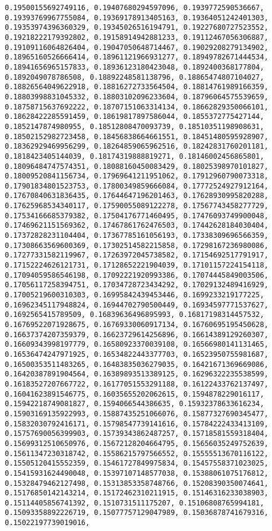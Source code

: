\documentclass[11pt]{article}
\begin{document}
\begin{Verbatim}[commandchars=\\\{\}]
0.19500155692749116, 0.19407680294597096, 0.1939772590536667, 0.19393769967755084, 0.19369178913405163, 0.19364051242401303, 0.19353974396360329, 0.19345026516194791, 0.19227680727523552, 0.19218222179392802, 0.19158914942881233, 0.19112467056306887, 0.19109116064826404, 0.19047050648714467, 0.19029208279134902, 0.18965160526666414, 0.18961121966931277, 0.18949782671444534, 0.18941656965157833, 0.18936123180423048, 0.1892400368177804, 0.1892049078786508, 0.18892248581138796, 0.18865474807104027, 0.18826564049622918, 0.18816272733564504, 0.18814761989166359, 0.18803998831045332, 0.18803102096233604, 0.18796064575539659, 0.18758715637692222, 0.18707151063314134, 0.18662829350066101, 0.18628422285591459, 0.18619817897586044, 0.1855372775427144, 0.1852147874980955, 0.18512808470093739, 0.18510351198908631, 0.18502152982723458, 0.18456838664661551, 0.18451480595928907, 0.18362929469956299, 0.18264859065962516, 0.18242831760201181, 0.1818423405144039, 0.18174319888819271, 0.18146002456865801, 0.18096484747574351, 0.18088160450083429, 0.18025398970101827, 0.18009520841156734, 0.17969641211951062, 0.17912960790073318, 0.17901834801523753, 0.17800349859666084, 0.17772524927912164, 0.17670840631836435, 0.17644647196201463, 0.17628930995820288, 0.17625968534340117, 0.17590055089122278, 0.17567743458277729, 0.17534166685379382, 0.17504176771460495, 0.17476093749900048, 0.17469621151569362, 0.17467861762476503, 0.17442628184030404, 0.17372828231104404, 0.17367785161056193, 0.17338309696566359, 0.17308663569600369, 0.17302514582215858, 0.17298167236980086, 0.17277331582119967, 0.17263972045738582, 0.17154692517791917, 0.17152224626121731, 0.17128652221904039, 0.17101157224154118, 0.17094059586546198, 0.17092221920993386, 0.17074445849003506, 0.17056117258394751, 0.17034728723434292, 0.17029132489416929, 0.17005219600310303, 0.16995842439453446, 0.1699233219177225, 0.16962345117948824, 0.16944702790500449, 0.16934597771537627, 0.1692565415789509, 0.16839636496895993, 0.16817198314457532, 0.16769522071928675, 0.16769330060917134, 0.16760695195450628, 0.16637374207359379, 0.16623729614256896, 0.16614389129260307, 0.16609343998197779, 0.16580923370039108, 0.16566980141131465, 0.16536474247971925, 0.16534822443377703, 0.16523950755981687, 0.16500353511483265, 0.16483835036279035, 0.16421671369669086, 0.16420387891904564, 0.16389893513389125, 0.16296322235538599, 0.16183527207667722, 0.16177051553291188, 0.16122433762137497, 0.16041623891546775, 0.16035655202062615, 0.1594878229016117, 0.15942218749081827, 0.1594066544386635, 0.15932378633616234, 0.15903169135922993, 0.15887435251066076, 0.15877327690345477, 0.15832030792416171, 0.15798547739141616, 0.15784222433413109, 0.15757690056399903, 0.15739343862487257, 0.15718581559318404, 0.15699312510650976, 0.15672128204664795, 0.15656035249752639, 0.15611347230318742, 0.15586215797566552, 0.15555513670116122, 0.15505120415552359, 0.15461727849975834, 0.15457558371023025, 0.15415931624490048, 0.15397107148577038, 0.15388061075176812, 0.15328479462127498, 0.15313853358748766, 0.15208390350074641, 0.15176850142143214, 0.15172462310211915, 0.15146316233038903, 0.15114405856741392, 0.1510731511175207, 0.15106808765994181, 0.15093358892226719, 0.15077757129047989, 0.15036878741679316, 0.15022197739019016, 
\end{Verbatim}
\end{document}
